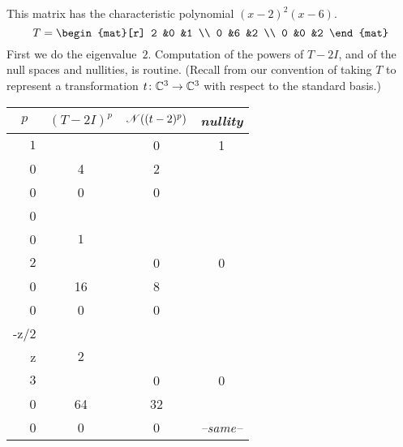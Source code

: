 \begin{example} \label{ex:FirstJordForm}
This matrix 
has the characteristic polynomial \( (x-2)^2(x-6) \).
\begin{equation*}
   T=
   \begin{mat}[r]
     2  &0  &1  \\
     0  &6  &2  \\
     0  &0  &2
   \end{mat}
\end{equation*}
First we do the eigenvalue~$2$.
Computation of the powers of $T-2I$, and of the null spaces and nullities, 
is routine.
(Recall from  our convention
of taking $T$ to represent a transformation $\mbox{$t\colon \mathbb{C}^3\to \mathbb{C}^3$}$
with respect to the standard basis.)
\begin{center}
  \renewcommand{\arraystretch}{1.25}
  \begin{tabular}{r|ccc} 
    \multicolumn{1}{c}{\( p \)}  
         &\( (T-2I)^p \) &\( \mathscr{N}((t-2)^p)  \) 
         &\textit{nullity}                                            \\  
    \hline
    \( 1 \)
    &\matrixvenlarge{\begin{mat}[r]
          0  &0  &1  \\
          0  &4  &2  \\
          0  &0  &0
        \end{mat}}
    &\( \set{\matrixvenlarge{\colvec{x \\ 0 \\ 0}}
         \suchthat x\in\C}  \)  
    &$1$                                                   \\
    \( 2 \)
    &\matrixvenlarge{\begin{mat}[r]
          0  &0  &0  \\
          0  &16 &8  \\
          0  &0  &0
        \end{mat}}
    &\( \set{\matrixvenlarge{\colvec{x \\ -z/2 \\  z}}
               \suchthat x,z\in\C}  \) 
    &$2$                                                   \\
    \( 3 \)
    &\matrixvenlarge{\begin{mat}[r]
          0  &0  &0  \\
          0  &64 &32 \\
          0  &0  &0
        \end{mat}}
    &\textit{--same--}

\end{tabular}
\end{center}
\end{example}
